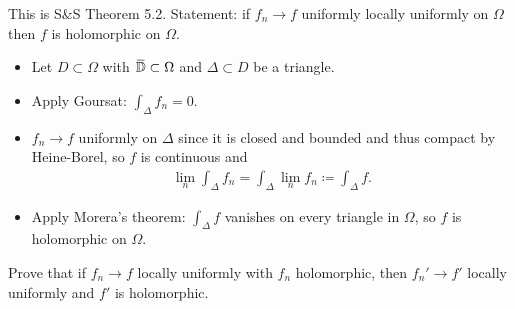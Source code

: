 \begin{solution}

This is S\&S Theorem 5.2. Statement: if \(f_n\to f\) uniformly locally
uniformly on \(\Omega\) then \(f\) is holomorphic on \(\Omega\).

\envlist

\begin{itemize}
\tightlist
\item
  Let \(D \subset \Omega\) with
  \(\mkern 1.5mu\overline{\mkern-1.5mu{\mathbb{D}}\mkern-1.5mu}\mkern 1.5mu\subset \Omega\)
  and \(\Delta \subset D\) be a triangle.
\item
  Apply Goursat: \(\int_\Delta f_n = 0\).
\item
  \(f_n\to f\) uniformly on \(\Delta\) since it is closed and bounded
  and thus compact by Heine-Borel, so \(f\) is continuous and
  \begin{align*}
  \lim_n \int_\Delta f_n = \int_\Delta \lim_n f_n \coloneqq\int_\Delta f
  .\end{align*}
\item
  Apply Morera's theorem: \(\int_\Delta f\) vanishes on every triangle
  in \(\Omega\), so \(f\) is holomorphic on \(\Omega\).
\end{itemize}

\end{solution}

\begin{exercise}[?]

Prove that if \(f_n\to f\) locally uniformly with \(f_n\) holomorphic,
then \(f_n'\to f'\) locally uniformly and \(f'\) is holomorphic.

\end{exercise}

